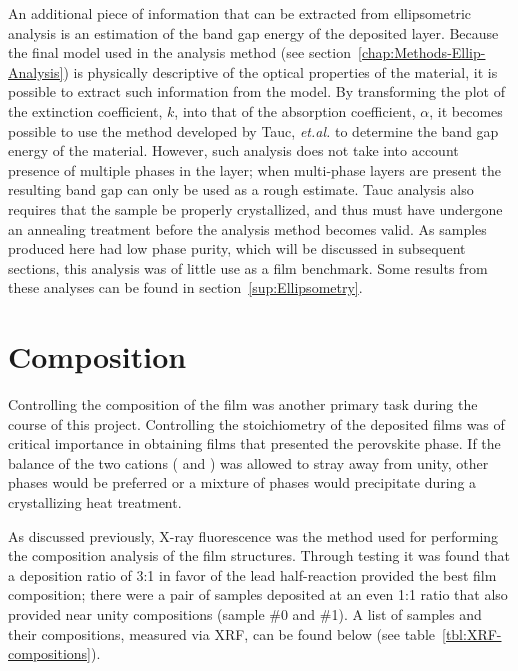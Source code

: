 An additional piece of information that can be extracted from ellipsometric analysis is an estimation of the band gap energy of the deposited layer. Because the final model used in the analysis method (see section~\vref{chap:Methods-Ellip-Analysis}) is physically descriptive of the optical properties of the material, it is possible to extract such information from the model. By transforming the plot of the extinction coefficient, $k$, into that of the absorption coefficient, $\alpha$, it becomes possible to use the method developed by Tauc, \emph{et.al.} to determine the band gap energy of the material.\cite{tauc_optical_1968,ablees_optical_1972} However, such analysis does not take into account presence of multiple phases in the layer; when multi-phase layers are present the resulting band gap can only be used as a rough estimate. Tauc analysis also requires that the sample be properly crystallized, and thus must have undergone an annealing treatment before the analysis method becomes valid. As samples produced here had low phase purity, which will be discussed in subsequent sections, this analysis was of little use as a film benchmark. Some results from these analyses can be found in section~\vref{sup:Ellipsometry}.


\section{Composition}
\label{chap:Results-Composition}

Controlling the composition of the film was another primary task during the course of this project. Controlling the stoichiometry of the deposited films was of critical importance in obtaining films that presented the perovskite phase. If the balance of the two cations (\PbIon{} and \TiIon{}) was allowed to stray away from unity, other phases would be preferred or a mixture of phases would precipitate during a crystallizing heat treatment.  

As discussed previously, X-ray fluorescence was the method used for performing the composition analysis of the film structures. Through testing it was found that a deposition ratio of 3:1 in favor of the lead half-reaction provided the best film composition; there were a pair of samples deposited at an even 1:1 ratio that also provided near unity compositions (sample \#0 and \#1). A list of samples and their compositions, measured via XRF, can be found below (see table~\vref{tbl:XRF-compositions}). 

